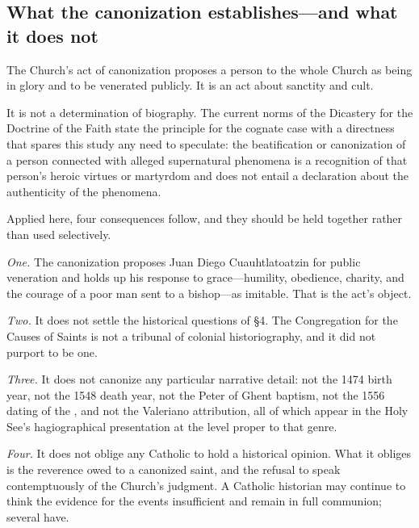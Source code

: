 \subsection{What the canonization establishes---and what it does not}

The Church's act of canonization proposes a person to the whole
Church as being in glory and to be venerated publicly. It is an act
about sanctity and cult.

It is not a determination of biography. The current norms of the
Dicastery for the Doctrine of the Faith state the principle for the
cognate case with a directness that spares this study any need to
speculate: the beatification or canonization of a person connected
with alleged supernatural phenomena is a recognition of that person's
heroic virtues or martyrdom and does not entail a declaration about
the authenticity of the phenomena.

Applied here, four consequences follow, and they should be held
together rather than used selectively.

\emph{One.} The canonization proposes Juan Diego Cuauhtlatoatzin for
public veneration and holds up his response to grace---humility,
obedience, charity, and the courage of a poor man sent to a
bishop---as imitable. That is the act's object.

\emph{Two.} It does not settle the historical questions of \S4. The
Congregation for the Causes of Saints is not a tribunal of colonial
historiography, and it did not purport to be one.

\emph{Three.} It does not canonize any particular narrative detail:
not the 1474 birth year, not the 1548 death year, not the Peter of
Ghent baptism, not the 1556 dating of the , and
not the Valeriano attribution, all of which appear in the Holy See's
hagiographical presentation at the level proper to that genre.

\emph{Four.} It does not oblige any Catholic to hold a historical
opinion. What it obliges is the reverence owed to a canonized saint,
and the refusal to speak contemptuously of the Church's judgment.
A Catholic historian may continue to think the evidence for the
events insufficient and remain in full communion; several have.
